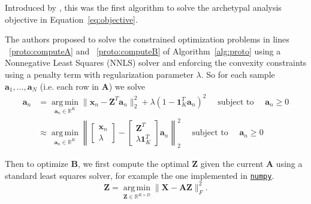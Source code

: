 \documentclass[oneside]{article}
\DeclareMathOperator*{\argmin}{arg\,min}
\begin{document}
Introduced by \textcite{cutlerArchetypalAnalysis1994}, this was the first algorithm to solve the archetypal analysis objective in Equation~\eqref{eq:objective}.

The authors proposed to solve the constrained optimization problems in lines ~\ref{proto:computeA} and ~\ref{proto:computeB} of Algorithm~\ref{alg:proto} using a Nonnegative Least Squares (NNLS) solver and enforcing the convexity constraints using a penalty term with regularization parameter $\lambda$. So for each sample $\mathbf{a}_1, ..., \mathbf{a}_N$ (i.e. each row in $\mathbf{A}$) we solve
\begin{equation}
    \label{eq:rnnls_update_A}
    \begin{aligned}
        \mathbf{a}_n
        &= \underset{\mathbf{a}_n \in \mathbb{R}^K}{\argmin} \|\mathbf{x}_n - \mathbf{Z}^T \mathbf{a}_n\|_2^2 + \lambda \left(1 - \mathbf{1}_K^T \mathbf{a}_n \right)^2 \quad \text{ subject to } \quad \mathbf{a}_n \geq 0 \\
        &\approx \underset{\mathbf{a}_n \in \mathbb{R}^K}{\argmin} \left\| \begin{bmatrix} \mathbf{x}_n \\ \lambda \end{bmatrix} -  \begin{bmatrix} \mathbf{Z}^T \\ \lambda \mathbf{1}_K^T \end{bmatrix} \mathbf{a}_n \right\|_2^2 \quad \text{ subject to } \quad \mathbf{a}_n \geq 0
    \end{aligned}
\end{equation}

Then to optimize $\mathbf{B}$, we first compute the optimal $\mathbf{Z}$ given the current $\mathbf{A}$ using a standard least squares solver, for example the one implemented in \href{https://numpy.org/doc/stable/reference/generated/numpy.linalg.lstsq.html}{\texttt{numpy}}.
\begin{equation}
\mathbf{Z} = \underset{\mathbf{Z} \in \mathbb{R}^{K \times D}}{\argmin} \| \mathbf{X} - \mathbf{A} \mathbf{Z}\|_F^2.
\end{equation}
\end{document}
